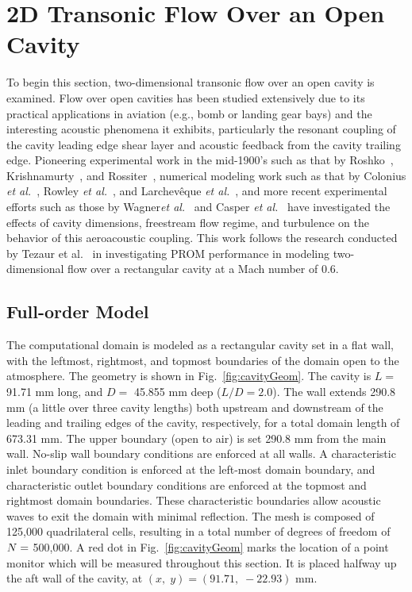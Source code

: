 \section{2D Transonic Flow Over an Open Cavity}\label{sec:cavity}

To begin this section, two-dimensional transonic flow over an open cavity is examined. Flow over open cavities has been studied extensively due to its practical applications in aviation (e.g., bomb or landing gear bays) and the interesting acoustic phenomena it exhibits, particularly the resonant coupling of the cavity leading edge shear layer and acoustic feedback from the cavity trailing edge. Pioneering experimental work in the mid-1900's such as that by Roshko~\cite{Roshko1952}, Krishnamurty~\cite{Krishnamurty1955}, and Rossiter~\cite{Rossiter1964}, numerical modeling work such as that by Colonius \textit{et al.}~\cite{Colonius1999}, Rowley \textit{et al.}~\cite{Rowley2002}, and Larchev\^{e}que \textit{et al.}~\cite{Larcheveque2007}, and more recent experimental efforts such as those by Wagner\textit{et al.}~\cite{Wagner2015} and Casper \textit{et al.}~\cite{Casper2018} have investigated the effects of cavity dimensions, freestream flow regime, and turbulence on the behavior of this aeroacoustic coupling. This work follows the research conducted by Tezaur et al.~\cite{Tezaur2016,Tezaur2017} in investigating PROM performance in modeling two-dimensional flow over a rectangular cavity at a Mach number of 0.6.

\subsection{Full-order Model}

The computational domain is modeled as a rectangular cavity set in a flat wall, with the leftmost, rightmost, and topmost boundaries of the domain open to the atmosphere. The geometry is shown in Fig.~\ref{fig:cavityGeom}. The cavity is $L =$ 91.71 mm long, and $D =$ 45.855 mm deep ($L/D = 2.0$). The wall extends 290.8 mm (a little over three cavity lengths) both upstream and downstream of the leading and trailing edges of the cavity, respectively, for a total domain length of 673.31 mm. The upper boundary (open to air) is set 290.8 mm from the main wall. No-slip wall boundary conditions are enforced at all walls. A characteristic inlet boundary condition is enforced at the left-most domain boundary, and characteristic outlet boundary conditions are enforced at the topmost and rightmost domain boundaries. These characteristic boundaries allow acoustic waves to exit the domain with minimal reflection. The mesh is composed of 125,000 quadrilateral cells, resulting in a total number of degrees of freedom of $N =$ 500,000. A red dot in Fig.~\ref{fig:cavityGeom} marks the location of a point monitor which will be measured throughout this section. It is placed halfway up the aft wall of the cavity, at $(x, \; y) = (91.71, \; -22.93)$ mm.

